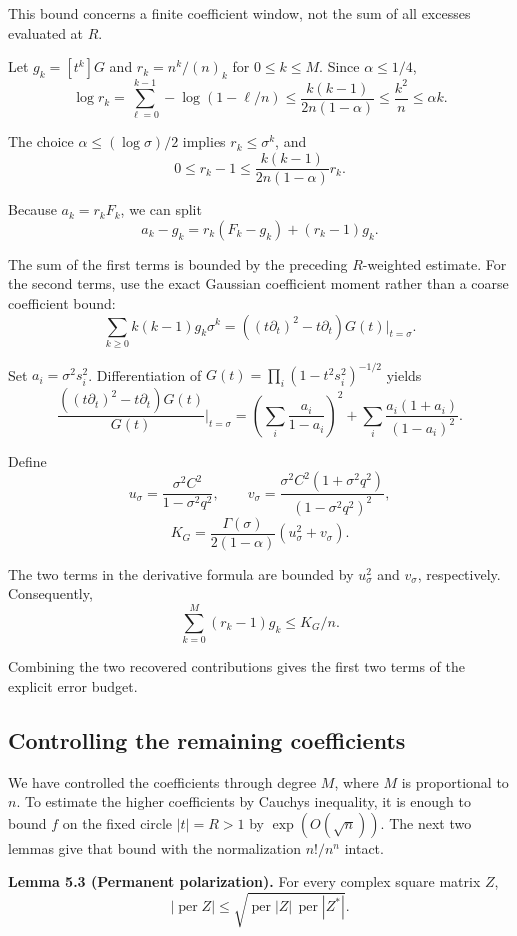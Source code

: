 \documentclass[11pt,a4paper]{article}
\makeatletter
\newcommand{\paperstatement}[3]{\par\addvspace{6pt}\Needspace{4\baselineskip}\phantomsection\def\@currentlabel{#2}\label{#3}\noindent\textbf{#1}\enspace}
\makeatother
\begin{document}
This bound concerns a finite coefficient window, not the sum of all excesses evaluated at \(R\).

Let \(g_k=[t^k]G\) and \(r_k=n^k/(n)_k\) for \(0\le k\le M\). Since \(\alpha\le1/4\),
\[\log r_k
=\sum_{\ell=0}^{k-1}-\log(1-\ell/n)
\le\frac{k(k-1)}{2n(1-\alpha)}
\le\frac{k^2}n
\le\alpha k.\]

The choice \(\alpha\le(\log\sigma)/2\) implies \(r_k\le\sigma^k\), and
\[0\le r_k-1
\le\frac{k(k-1)}{2n(1-\alpha)}r_k.\]

Because \(a_k=r_kF_k\), we can split
\[a_k-g_k=r_k(F_k-g_k)+(r_k-1)g_k.\]

The sum of the first terms is bounded by the preceding \(R\)-weighted estimate. For the second terms, use the exact Gaussian coefficient moment rather than a coarse coefficient bound:
\[\sum_{k\ge0}k(k-1)g_k\sigma^k
=\left((t\partial_t)^2-t\partial_t\right)G(t)\big|_{t=\sigma}.\]

Set \(a_i=\sigma^2s_i^2\). Differentiation of \(G(t)=\prod_i(1-t^2s_i^2)^{-1/2}\) yields
\[\frac{\left((t\partial_t)^2-t\partial_t\right)G(t)}{G(t)}
\bigg|_{t=\sigma}
=\left(\sum_i\frac{a_i}{1-a_i}\right)^2
+\sum_i\frac{a_i(1+a_i)}{(1-a_i)^2}.\]

Define
\[u_\sigma=\frac{\sigma^2C^2}{1-\sigma^2q^2},
\qquad
v_\sigma=\frac{\sigma^2C^2(1+\sigma^2q^2)}
{(1-\sigma^2q^2)^2},\]
\nopagebreak[3]\[K_G=\frac{\Gamma(\sigma)}{2(1-\alpha)}
\left(u_\sigma^2+v_\sigma\right).\]

The two terms in the derivative formula are bounded by \(u_\sigma^2\) and \(v_\sigma\), respectively. Consequently,
\[\sum_{k=0}^{M}(r_k-1)g_k\le K_G/n.\]

Combining the two recovered contributions gives the first two terms of the explicit error budget.

\subsection{Controlling the remaining coefficients}\label{sec-5.5}

We have controlled the coefficients through degree \(M\), where \(M\) is proportional to \(n\). To estimate the higher coefficients by Cauchy\textquotesingle s inequality, it is enough to bound \(f\) on the fixed circle \(|t|=R>1\) by \(\exp(O(\sqrt n))\). The next two lemmas give that bound with the normalization \(n!/n^n\) intact.

\paperstatement{Lemma 5.3 (Permanent polarization).}{5.3}{thm-5.3} For every complex square matrix \(Z\),
\[|\operatorname{per}Z|
\le\sqrt{\operatorname{per}|Z|\,
\operatorname{per}|Z^*|}.\]
\end{document}
